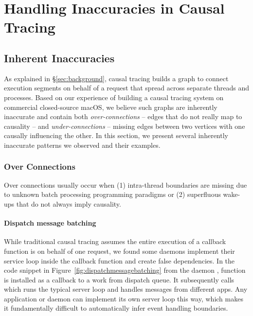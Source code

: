 \section{Handling Inaccuracies in Causal Tracing}\label{sec:inaccuracy}

\subsection{Inherent Inaccuracies}


As explained in \S\ref{sec:background}, causal tracing builds a graph to connect
execution segments on behalf of a request that spread across separate threads
and processes. Based on our experience of building a causal tracing system on
commercial closed-source macOS, we believe such graphs are inherently inaccurate
and contain both \emph{over-connections} -- edges that do not really map to
causality -- and \emph{under-connections} -- missing edges between two vertices
with one causally influencing the other. In this section, we present several
inherently inaccurate patterns we observed and their examples.

\subsubsection{Over Connections} \label{subsec:overconnections}

Over connections usually occur when (1) intra-thread boundaries are missing due
to unknown batch processing programming paradigms or (2) superfluous wake-ups
that do not always imply causality.

\paragraph{Dispatch message batching}

While traditional causal tracing assumes the entire execution of a callback
function is on behalf of one request, we found some daemons implement their
service loop inside the callback function and create false dependencies. In the
code snippet in Figure~\ref{fig:dispatchmessagebatching} from the 
daemon , function  is installed as a callback to
a work from dispatch queue. It subsequently calls 
which runs the typical server loop and handles messages from different apps. Any
application or daemon can implement its own server loop this way, which makes it
fundamentally difficult to automatically infer event handling boundaries.

